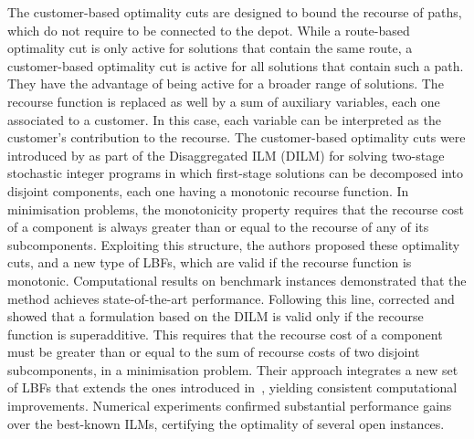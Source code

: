 \documentclass[11pt]{article}
\theoremstyle{definition}
\begin{document}
The customer-based optimality cuts are designed to bound the recourse of paths, which do not require to be connected to the depot. While a route-based optimality cut is only active for solutions that contain the same route, a customer-based optimality cut is active for all solutions that contain such a path. They have the advantage of being active for a broader range of solutions. The recourse function is replaced as well by a sum of auxiliary variables, each one associated to a customer. In this case, each variable can be interpreted as the customer's contribution to the recourse.
%
%
The customer-based optimality cuts were introduced by \citet{Lucas2024} as part of the Disaggregated ILM (DILM) for solving two-stage stochastic integer programs in which first-stage solutions can be decomposed into disjoint components, each one having a monotonic recourse function. In minimisation problems, the monotonicity property requires that the recourse cost of a component is always greater than or equal to the recourse of any of its subcomponents. Exploiting this structure, the authors proposed these optimality cuts, and a new type of LBFs, which are valid if the recourse function is monotonic. Computational results on benchmark instances demonstrated that the method achieves state-of-the-art performance.
%
Following this line, \citet{Legault2025} corrected \citet{Lucas2024} and showed that a formulation based on the DILM is valid only if the recourse function is superadditive. This requires that the recourse cost of a component must be greater than or equal to the sum of recourse costs of two disjoint subcomponents, in a minimisation problem. Their approach integrates a new set of LBFs that extends the ones introduced in~\citet{Lucas2024}, yielding consistent computational improvements. Numerical experiments confirmed substantial performance gains over the best-known ILMs, certifying the optimality of several open instances.

\end{document}
